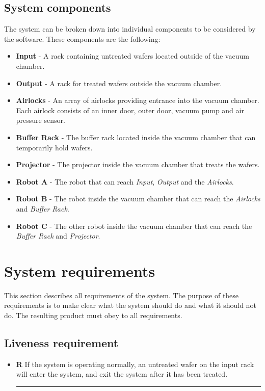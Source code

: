 \documentclass[12pt]{report}
\newcounter{counter}
\begin{document}
	\section{System components}
	The system can be broken down into individual components to be considered by the software. These components are the following:
	\begin{itemize}
	\item \textbf{Input} - A rack containing untreated wafers located outside of the vacuum chamber.
	\item \textbf{Output} - A rack for treated wafers outside the vacuum chamber.
	\item \textbf{Airlocks} - An array of airlocks providing entrance into the vacuum chamber. Each airlock consists of an inner door, outer door, vacuum pump and air pressure sensor.
	\item \textbf{Buffer Rack} - The buffer rack located inside the vacuum chamber that can temporarily hold wafers.
	\item \textbf{Projector} - The projector inside the vacuum chamber that treats the wafers.
	\item \textbf{Robot A} - The robot that can reach \emph{Input}, \emph{Output} and the \emph{Airlocks}.
	\item \textbf{Robot B} - The robot inside the vacuum chamber that can reach the \emph{Airlocks} and \emph{Buffer Rack}.
	\item \textbf{Robot C} - The other robot inside the vacuum chamber that can reach the \emph{Buffer Rack} and \emph{Projector}.
	\end{itemize}
	
	\chapter{System requirements}
	
	\newcommand{\req}[1]{
		\item[\textbf{R\stepcounter{counter}\arabic{counter}}] {#1}
		\hrule
	}
	
	\newcommand{\reqb}[2]{
		\item[\textbf{{#1}}] {#2}
		\hrule
	}
	
	This section describes all requirements of the system. The purpose of these requirements is to make clear what the system should do and what it should not do. The resulting product must obey to all requirements.
	\section{Liveness requirement}
	\begin{itemize}
		\req{If the system is operating normally, an untreated wafer on the input rack will enter the system, and exit the system after it has been treated.}
	\end{itemize}
	
\end{document}
